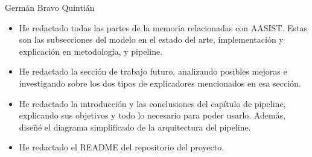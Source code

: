 \begin{contribucion}{Germán Bravo Quintián}
\begin{itemize}
    \item He redactado todas las partes de la memoria relacionadas con AASIST. Estas son las subsecciones del modelo en el estado del arte, implementación y explicación en metodología, y pipeline.
    \item He redactado la sección de trabajo futuro, analizando posibles mejoras e investigando sobre los dos tipos de explicadores mencionados en esa sección.
    \item He redactado la introducción y las conclusiones del capítulo de pipeline, explicando sus objetivos y todo lo necesario para poder usarlo. Además, diseñé el diagrama simplificado de la arquitectura del pipeline.
    \item He redactado el README del repositorio del proyecto.
\end{itemize}
\end{contribucion}